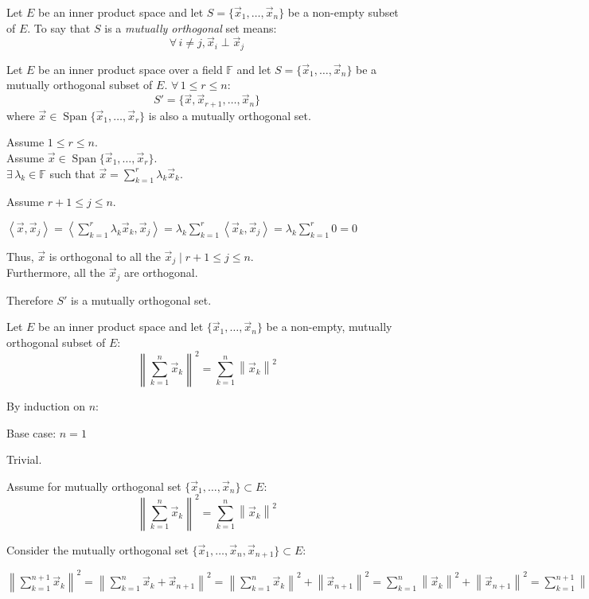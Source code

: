 \documentclass[letterpaper,12pt,fleqn]{article}
\newcommand{\vx}{\vec{x}}
\newcommand{\norm}[1]{\left\|#1\right\|}
\newcommand{\inner}[2]{\left<#1,#2\right>}
\renewcommand{\l}{\lambda}
\newcommand{\F}{\mathbb{F}}
\DeclareMathOperator{\spn}{Span}
\begin{document}
\begin{definition}
  Let $E$ be an inner product space and let $S=\{\vx_1,\ldots,\vx_n\}$ be a
  non-empty subset of $E$. To say that $S$ is a \emph{mutually orthogonal} set
  means:
  \[\forall\,i\ne j,\vx_i\perp\vx_j\]
\end{definition}

\begin{lemma}
  Let $E$ be an inner product space over a field $\F$ and let
  $S=\{\vx_1,\ldots,\vx_n\}$ be a mutually orthogonal subset of $E$.
  $\forall\,1\le r\le n$:
  \[S'=\{\vx,\vx_{r+1},\ldots,\vx_n\}\]
  where $\vx\in\spn\{\vx_1,\ldots,\vx_r\}$ is also a mutually orthogonal set.
\end{lemma}

\begin{theproof}
  Assume $1\le r\le n$. \\
  Assume $\vx\in\spn\{\vx_1,\ldots,\vx_r\}$. \\
  $\exists\,\l_k\in\F$ such that $\vx=\sum_{k=1}^r\l_k\vx_k$.

  Assume $r+1\le j\le n$.

  $\inner{\vx}{\vx_j}=\inner{\sum_{k=1}^r\l_k\vx_k}{\vx_j}=
  \l_k\sum_{k=1}^r\inner{\vx_k}{\vx_j}=\l_k\sum_{k=1}^r0=0$

  Thus, $\vx$ is orthogonal to all the $\vx_j\mid r+1\le j\le n$. \\
  Furthermore, all the $\vx_j$ are orthogonal.

  Therefore $S'$ is a mutually orthogonal set.
\end{theproof}

\begin{corollary}
  Let $E$ be an inner product space and let $\{\vx_1,\ldots,\vx_n\}$ be a
  non-empty, mutually orthogonal subset of $E$:
  \[\norm{\sum_{k=1}^n\vx_k}^2=\sum_{k=1}^n\norm{\vx_k}^2\]
\end{corollary}

\begin{theproof}
  By induction on $n$:
  \begin{description}
  \item Base case: $n=1$

    Trivial.

  \item Assume for mutually orthogonal set $\{\vx_1,\ldots,\vx_n\}\subset E$:
    \[\norm{\sum_{k=1}^n\vx_k}^2=\sum_{k=1}^n\norm{\vx_k}^2\]

  \item Consider the mutually orthogonal set
    $\{\vx_1,\ldots,\vx_n,\vx_{n+1}\}\subset E$:

    $\norm{\sum_{k=1}^{n+1}\vx_k}^2=\norm{\sum_{k=1}^n\vx_k+\vx_{n+1}}^2=
    \norm{\sum_{k=1}^n\vx_k}^2+\norm{\vx_{n+1}}^2=
    \sum_{k=1}^n\norm{\vx_k}^2+\norm{\vx_{n+1}}^2=
    \sum_{k=1}^{n+1}\norm{\vx_k}^2$
  \end{description}
\end{theproof}
\end{document}
